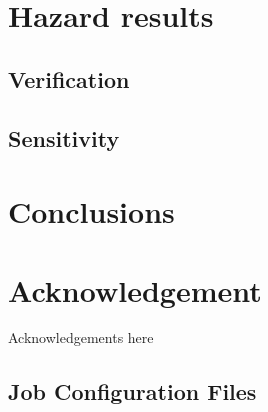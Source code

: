 \documentclass{article}
\begin{document}
\section{Hazard results}
\label{sec:Hazard}

\subsection{Verification}
\label{sec:Verification}

\subsection{Sensitivity}
\label{subsec:Sensitivity}

\section{Conclusions}
\label{sec:Conclusions}

\section*{Acknowledgement}
Acknowledgements here

\cleardoublepage
{}
{}



\begin{appendices}

\section{}
\subsection{Job Configuration Files}
\label{ch:Jobs}



\end{appendices}
\end{document}
